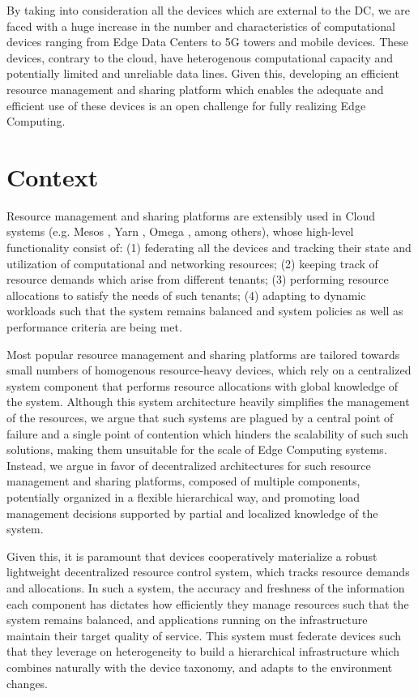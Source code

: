 By taking into consideration all the devices which are external to the DC, we are faced with a huge increase in the number and characteristics of computational devices ranging from Edge Data Centers to 5G towers and mobile devices. These devices, contrary to the cloud, have heterogenous computational capacity and potentially limited and unreliable data lines. Given this, developing an efficient resource management and sharing platform which enables the adequate and efficient use of these devices is an open challenge for fully realizing Edge Computing. 

\section{Context}

Resource management and sharing platforms are extensibly used in Cloud systems (e.g. Mesos \cite{hindman2011mesos}, Yarn \cite{Vavilapalli2013ApacheHY}, Omega \cite{41684}, among others), whose high-level functionality consist of: (1) federating all the devices and tracking their state and utilization of computational and networking resources; (2) keeping track of resource demands which arise from different tenants; (3) performing resource allocations to satisfy the needs of such tenants; (4) adapting to dynamic workloads such that the system remains balanced and system policies as well as performance criteria are being met.

Most popular resource management and sharing platforms are tailored towards small numbers of homogenous resource-heavy devices, which rely on a centralized system component that performs resource allocations with global knowledge of the system. Although this system architecture heavily simplifies the management of the resources, we argue that such systems are plagued by a central point of failure and a single point of contention which hinders the scalability of such such solutions, making them unsuitable for the scale of Edge Computing systems. Instead, we argue in favor of decentralized architectures for such resource management and sharing platforms, composed of multiple components, potentially organized in a flexible hierarchical way, and promoting load management decisions supported by partial and localized knowledge of the system.

Given this, it is paramount that devices cooperatively materialize a robust lightweight decentralized resource control system, which tracks resource demands and allocations. In such a system, the accuracy and freshness of the information each component has dictates how efficiently they manage resources such that the system remains balanced, and applications running on the infrastructure maintain their target quality of service. This system must federate devices such that they leverage on heterogeneity to build a hierarchical infrastructure which combines naturally with the device taxonomy, and adapts to the environment changes.

